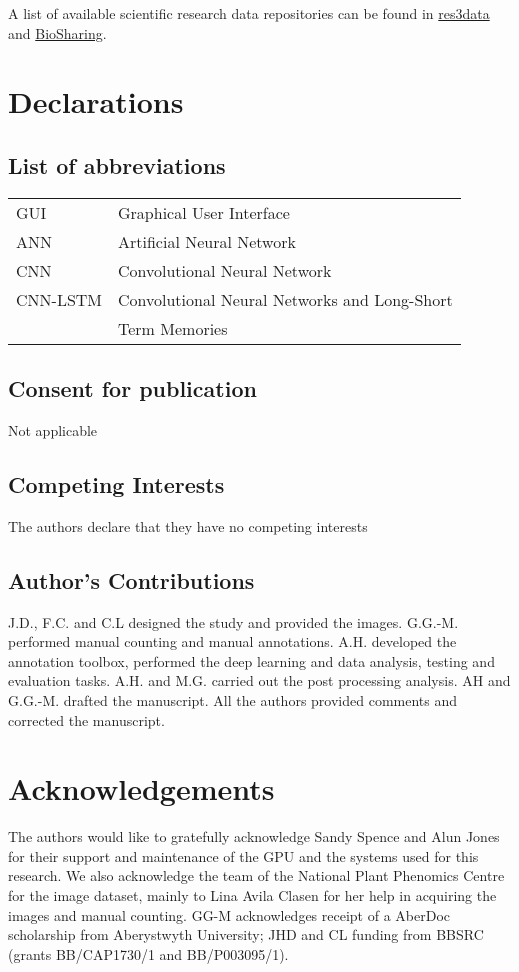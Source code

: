 \documentclass[a4paper,num-refs]{oup-contemporary}
\begin{document}
A list of available scientific research data repositories can be found in \href{http://www.re3data.org/}{res3data} and \href{https://biosharing.org/}{BioSharing}.

\section{Declarations}

\subsection{List of abbreviations}
\noindent 
\begin{tabular}{@{}ll}
GUI & Graphical User Interface \\
ANN & Artificial Neural Network\\
CNN & Convolutional Neural Network\\
CNN-LSTM & Convolutional Neural Networks and Long-Short \\ 
& Term Memories\\
\end{tabular}

\subsection{Consent for publication}
Not applicable

\subsection{Competing Interests}
The authors declare that they have no competing interests

\subsection{Author's Contributions}
J.D., F.C. and C.L designed the study and provided the images. G.G.-M. performed manual counting and manual annotations. A.H. developed the annotation toolbox, performed the deep learning and data analysis, testing and evaluation tasks. A.H. and M.G. carried out the post processing analysis. AH and G.G.-M. drafted the manuscript. All the authors provided comments and corrected the manuscript.

\section{Acknowledgements}
The authors would like to gratefully acknowledge Sandy Spence and Alun Jones for their support and maintenance of the GPU and the systems used for this research. We also acknowledge the team of the National Plant Phenomics Centre for the image dataset, mainly to Lina Avila Clasen for her help in acquiring the images and manual counting. GG-M acknowledges receipt of a AberDoc scholarship from Aberystwyth University; JHD and CL funding from BBSRC (grants BB/CAP1730/1 and BB/P003095/1).



\end{document}
